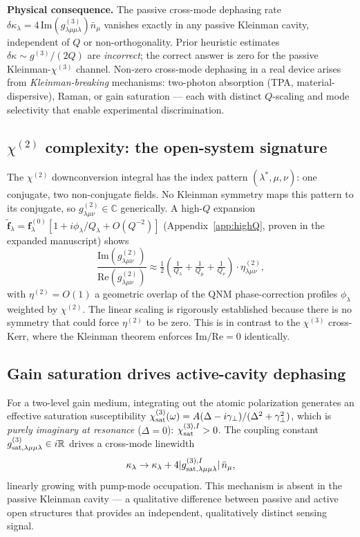 \documentclass[11pt]{article}
\newcommand{\tf}{\tilde{\mathbf{f}}}
\begin{document}
\textbf{Physical consequence.}  The passive cross-mode dephasing rate
$\delta\kappa_\lambda=4\,\mathrm{Im}(g^{(3)}_{\lambda\mu\mu\lambda})
\bar{n}_\mu$ vanishes exactly in any passive Kleinman cavity,
independent of $Q$ or non-orthogonality.  Prior heuristic estimates
$\delta\kappa\sim g^{(3)}/(2Q)$ are \emph{incorrect}; the correct
answer is zero for the passive Kleinman-$\chi^{(3)}$ channel.
Non-zero cross-mode dephasing in a real device arises from
\emph{Kleinman-breaking} mechanisms: two-photon absorption
(TPA, material-dispersive),
Raman, or gain saturation --- each with distinct $Q$-scaling and mode
selectivity that enable experimental discrimination.

\subsection{$\chi^{(2)}$ complexity: the open-system signature}
\label{sec:chi2-complex}

The $\chi^{(2)}$ downconversion integral has the index pattern
$(\lambda^*,\mu,\nu)$: one conjugate, two non-conjugate fields.  No
Kleinman symmetry maps this pattern to its conjugate, so
$g^{(2)}_{\lambda\mu\nu}\in\mathbb{C}$ generically.  A
high-$Q$ expansion
$\tf_\lambda=\mathbf{f}^{(0)}_\lambda[1+i\phi_\lambda/Q_\lambda
+O(Q^{-2})]$ (Appendix~\ref{app:highQ}, proven in the expanded
manuscript) shows
\begin{equation}
  \boxed{\frac{\mathrm{Im}(g^{(2)}_{\lambda\mu\nu})}
  {\mathrm{Re}(g^{(2)}_{\lambda\mu\nu})} \approx
  \tfrac{1}{2}\!\left(\tfrac{1}{Q_\lambda}+\tfrac{1}{Q_\mu}
  +\tfrac{1}{Q_\nu}\right)\cdot\eta^{(2)}_{\lambda\mu\nu},}
  \label{eq:chi2_predict}
\end{equation}
with $\eta^{(2)}=O(1)$ a geometric overlap of the QNM phase-correction
profiles $\phi_\lambda$ weighted by $\chi^{(2)}$.  The linear
scaling is rigorously established because there is no symmetry that
could force $\eta^{(2)}$ to be zero.  This is in contrast to the
$\chi^{(3)}$ cross-Kerr, where the Kleinman theorem enforces
$\mathrm{Im}/\mathrm{Re}=0$ identically.

\subsection{Gain saturation drives active-cavity dephasing}
\label{sec:gain-sat}

For a two-level gain medium, integrating out the atomic polarization
generates an effective saturation susceptibility
\(\chi^{(3)}_{\rm sat}(\omega)=A(\Delta-i\gamma_\perp)/(\Delta^2+\gamma_\perp^2)\),
which is \emph{purely imaginary at resonance} ($\Delta=0$):
\(\chi^{(3),I}_{\rm sat}>0\).  The coupling constant
$g^{(3)}_{\rm sat,\lambda\mu\mu\lambda}\in i\mathbb{R}$ drives a
cross-mode linewidth
\begin{equation}
  \kappa_\lambda \to \kappa_\lambda +
  4|g^{(3),I}_{\rm sat,\lambda\mu\mu\lambda}|\,\bar{n}_\mu,
  \label{eq:active_dephasing}
\end{equation}
linearly growing with pump-mode occupation.  This mechanism is
absent in the passive Kleinman cavity --- a qualitative difference
between passive and active open structures that provides an
independent, qualitatively distinct sensing signal.
\end{document}
